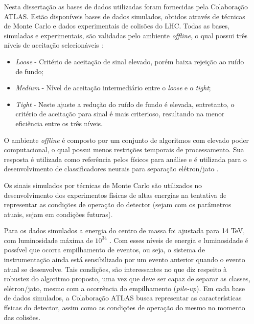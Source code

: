 Nesta dissertação as bases de dados utilizadas foram fornecidas pela Colaboração ATLAS. Estão disponíveis bases de dados simulados, obtidos através de técnicas de Monte Carlo e dados experimentais de colisões do LHC. Todas as bases, simuladas e experimentais, são validadas pelo ambiente \textit{offline}, o qual possui três níveis de aceitação selecionáveis \cite{me:costa2016}:

\begin{itemize}
	\item \textit{Loose} - Critério de aceitação de sinal elevado, porém baixa rejeição ao ruído de fundo; 
	\item \textit{Medium} - Nível de aceitação intermediário entre o \textit{loose} e o \textit{tight};
	\item \textit{Tight} - Neste ajuste a redução do ruído de fundo é elevada, entretanto, o critério de aceitação para sinal é mais criterioso, resultando na menor eficiência entre os três níveis.
\end{itemize}

O ambiente \textit{offline} é composto por um conjunto de algoritmos com elevado poder computacional, o qual possui menos restrições temporais de processamento. Sua resposta é utilizada como referência pelos físicos para análise e é utilizada para o desenvolvimento de classificadores neurais para separação elétron/jato \cite{me:edmar2015}.


Os sinais simulados por técnicas de Monte Carlo \cite{yoriyaz2009} são utilizados no desenvolvimento dos experimentos físicas de altas energias na tentativa de representar as condições de operação do detector (sejam com os parâmetros atuais, sejam em condições futuras).

Para os dados simulados a energia do centro de massa foi ajustada para 14 TeV, com luminosidade máxima de $10^{34}$ \cite{me:edmar2015}. Com esses níveis de energia e luminosidade é possível que ocorra empilhamento de eventos, ou seja, o sistema de instrumentação ainda está sensibilizado por um evento anterior quando o evento atual se desenvolve. Tais condições, são interessantes no que diz respeito à robustez do algoritmo proposto, uma vez que deve ser capaz de separar as classes, elétron/jato, mesmo com a ocorrência do empilhamento (\textit{pile-up}). Em cada base de dados simulados, a Colaboração ATLAS busca representar as características físicas do detector, assim como as condições de operação do mesmo no momento das colisões.


